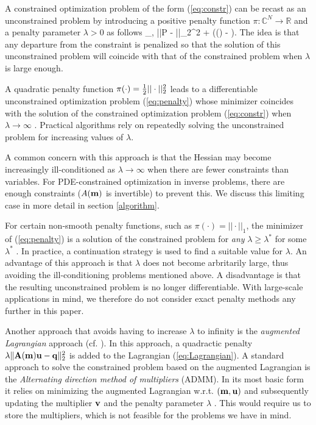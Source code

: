\documentclass{iopart}
\begin{document}
A constrained optimization problem of the form (\ref{eq:constr}) can be recast as an unconstrained problem by introducing a positive penalty function $\pi: \mathbb{C}^{N}\rightarrow\mathbb{R}$ and a penalty parameter $\lambda>0$ as follows
\bq
\label{eq:penalty}
\min_{,} ||P - ||_2^2 + \lambda\pi(() - ).
\eq
The idea is that any departure from the constraint is penalized so that the solution of this unconstrained problem will coincide with that of the constrained problem when $\lambda$ is large enough.

A quadratic penalty function $\pi(\cdot) = {\textstyle\frac{1}{2}}||\cdot||_2^2$ leads to a differentiable unconstrained optimization problem (\ref{eq:penalty}) whose minimizer coincides with the solution of the constrained optimization problem (\ref{eq:constr}) when $\lambda \rightarrow \infty$ \cite[Thm. 17.1]{Nocedal}. Practical algorithms rely on repeatedly solving the unconstrained problem for increasing values of $\lambda$.

A common concern with this approach is that the Hessian may become increasingly ill-conditioned as $\lambda\rightarrow\infty$ when there are fewer constraints than variables. For PDE-constrained optimization in inverse problems, there are enough constraints ($A(\mathbf{m})$ is invertible) to prevent this. We discuss this limiting case in more detail in section \ref{algorithm}.

For certain non-smooth penalty functions, such as $\pi(\cdot) = ||\cdot||_1$, the minimizer of (\ref{eq:penalty}) is a solution of the constrained problem for \emph{any} $\lambda \geq \lambda^*$ for some $\lambda^*$ \cite[Thm. 17.3]{Nocedal}. In practice, a continuation strategy is used to find a suitable value for $\lambda$. An advantage of this approach is that $\lambda$ does not become arbritarily large, thus avoiding the ill-conditioning problems mentioned above. A disadvantage is that the resulting unconstrained problem is no longer differentiable. With large-scale applications in mind, we therefore do not consider exact penalty methods any further in this paper.

Another approach that avoids having to increase $\lambda$ to infinity is the \emph{augmented Lagrangian} approach (cf. \cite{Nocedal}). In this approach, a quadractic penalty $\lambda\|\mathbf{A}(\mathbf{m})\mathbf{u} - \mathbf{q}\|_2^2$ is added to the Lagrangian (\ref{eq:Lagrangian}). A standard approach to solve the constrained problem based on the augmented Lagrangian is the \emph{Alternating direction method of multipliers} (ADMM). In its most basic form it relies on minimizing the augmented Lagrangian w.r.t. $(\mathbf{m}, \mathbf{u})$ and subsequently updating the multiplier $\mathbf{v}$ and the penalty parameter $\lambda$ \cite{Eckstein2012a,Curtis2014}. This would require us to store the multipliers, which is not feasible for the problems we have in mind.
\end{document}
